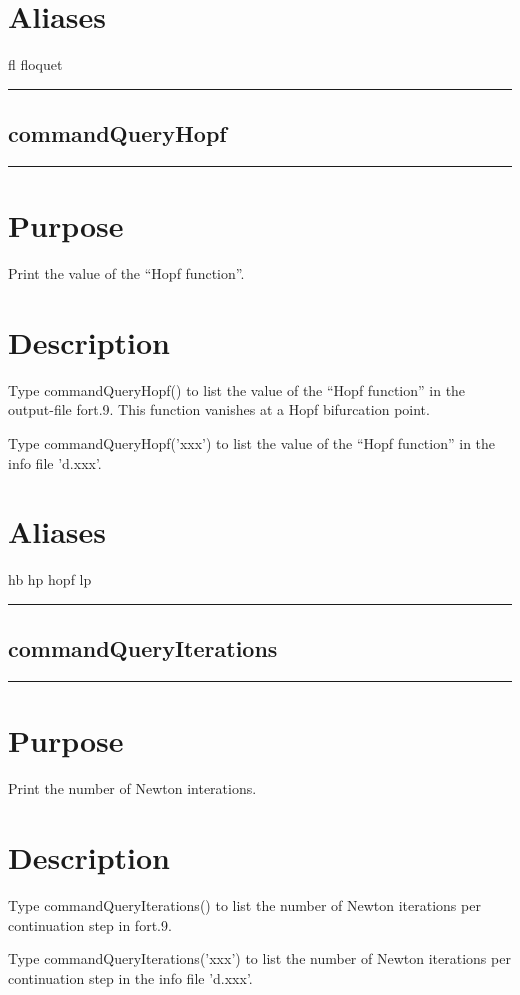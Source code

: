 \documentclass[12pt]{report}
\begin{document}
\begin{minipage}{6in}
    \section*{Aliases}
fl floquet \medskip\hrule\end{minipage}\subsection{commandQueryHopf} \label{sec:clui_ref_commandQueryHopf}\begin{minipage}{6in}\hrule\medskip\section*{Purpose}
Print the value of the ``Hopf function''.\section*{Description}

    Type commandQueryHopf() to list the value of the ``Hopf function'' 
    in the output-file fort.9. This function
    vanishes at a Hopf bifurcation point.

    Type commandQueryHopf('xxx') to list the value of the ``Hopf function''
    in the info file 'd.xxx'.
    \section*{Aliases}
hb hp hopf lp \medskip\hrule\end{minipage}\subsection{commandQueryIterations} \label{sec:clui_ref_commandQueryIterations}\begin{minipage}{6in}\hrule\medskip\section*{Purpose}
Print the number of Newton interations.\section*{Description}

    Type commandQueryIterations() to list the number of Newton iterations per
    continuation step in fort.9. 

    Type commandQueryIterations('xxx') to list the number of Newton iterations per
    continuation step in the info file 'd.xxx'.

\end{minipage}
\end{document}
